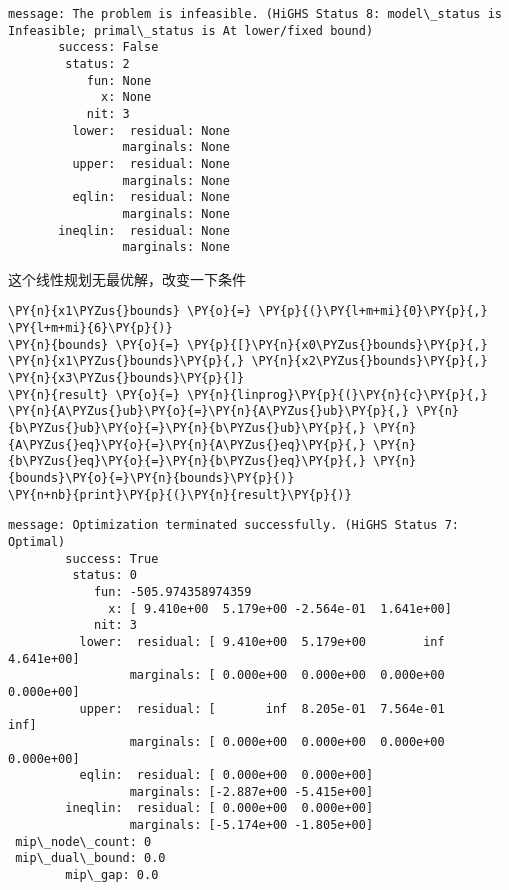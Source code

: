     \begin{Verbatim}[commandchars=\\\{\}]
       message: The problem is infeasible. (HiGHS Status 8: model\_status is
Infeasible; primal\_status is At lower/fixed bound)
       success: False
        status: 2
           fun: None
             x: None
           nit: 3
         lower:  residual: None
                marginals: None
         upper:  residual: None
                marginals: None
         eqlin:  residual: None
                marginals: None
       ineqlin:  residual: None
                marginals: None
    \end{Verbatim}

    这个线性规划无最优解，改变一下条件

    \begin{tcolorbox}[breakable, size=fbox, boxrule=1pt, pad at break*=1mm,colback=cellbackground, colframe=cellborder]
\begin{Verbatim}[commandchars=\\\{\}]
\PY{n}{x1\PYZus{}bounds} \PY{o}{=} \PY{p}{(}\PY{l+m+mi}{0}\PY{p}{,} \PY{l+m+mi}{6}\PY{p}{)}
\PY{n}{bounds} \PY{o}{=} \PY{p}{[}\PY{n}{x0\PYZus{}bounds}\PY{p}{,} \PY{n}{x1\PYZus{}bounds}\PY{p}{,} \PY{n}{x2\PYZus{}bounds}\PY{p}{,} \PY{n}{x3\PYZus{}bounds}\PY{p}{]}
\PY{n}{result} \PY{o}{=} \PY{n}{linprog}\PY{p}{(}\PY{n}{c}\PY{p}{,} \PY{n}{A\PYZus{}ub}\PY{o}{=}\PY{n}{A\PYZus{}ub}\PY{p}{,} \PY{n}{b\PYZus{}ub}\PY{o}{=}\PY{n}{b\PYZus{}ub}\PY{p}{,} \PY{n}{A\PYZus{}eq}\PY{o}{=}\PY{n}{A\PYZus{}eq}\PY{p}{,} \PY{n}{b\PYZus{}eq}\PY{o}{=}\PY{n}{b\PYZus{}eq}\PY{p}{,} \PY{n}{bounds}\PY{o}{=}\PY{n}{bounds}\PY{p}{)}
\PY{n+nb}{print}\PY{p}{(}\PY{n}{result}\PY{p}{)}
\end{Verbatim}
\end{tcolorbox}

    \begin{Verbatim}[commandchars=\\\{\}]
        message: Optimization terminated successfully. (HiGHS Status 7: Optimal)
        success: True
         status: 0
            fun: -505.974358974359
              x: [ 9.410e+00  5.179e+00 -2.564e-01  1.641e+00]
            nit: 3
          lower:  residual: [ 9.410e+00  5.179e+00        inf  4.641e+00]
                 marginals: [ 0.000e+00  0.000e+00  0.000e+00  0.000e+00]
          upper:  residual: [       inf  8.205e-01  7.564e-01        inf]
                 marginals: [ 0.000e+00  0.000e+00  0.000e+00  0.000e+00]
          eqlin:  residual: [ 0.000e+00  0.000e+00]
                 marginals: [-2.887e+00 -5.415e+00]
        ineqlin:  residual: [ 0.000e+00  0.000e+00]
                 marginals: [-5.174e+00 -1.805e+00]
 mip\_node\_count: 0
 mip\_dual\_bound: 0.0
        mip\_gap: 0.0
    \end{Verbatim}

